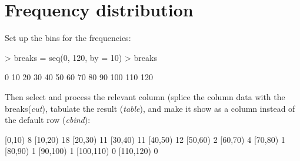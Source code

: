 \documentclass[a4paper,10pt]{article}
\begin{document}
\section{Frequency distribution}

Set up the bins for the frequencies:

\begin{Schunk}
\begin{Sinput}
> breaks = seq(0, 120, by = 10)
> breaks
\end{Sinput}
\begin{Soutput}
 [1]   0  10  20  30  40  50  60  70  80  90 100 110 120
\end{Soutput}
\end{Schunk}

Then select and process the relevant column (splice the column data with the breaks(\textit{cut}), tabulate the result (\textit{table}), and make it show as a column instead of the default row (\textit{cbind}):
\begin{Schunk}
\begin{Soutput}
          [,1]
[0,10)       8
[10,20)     18
[20,30)     11
[30,40)     11
[40,50)     12
[50,60)      2
[60,70)      4
[70,80)      1
[80,90)      1
[90,100)     1
[100,110)    0
[110,120)    0
\end{Soutput}
\end{Schunk}
\end{document}
